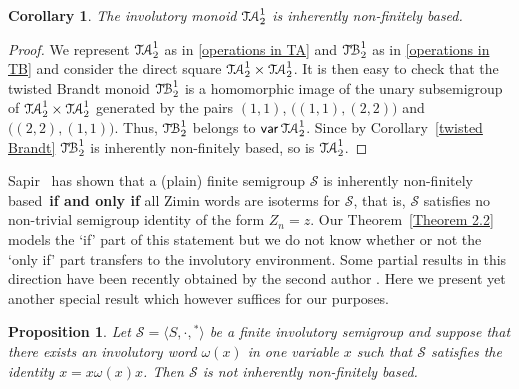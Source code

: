 \documentclass[11pt,reqno]{amsart}
\DeclareMathOperator{\var}{\mathsf{var}}
\numberwithin{equation}{section}
\newtheorem{Prop}[Thm]{Proposition}
\newtheorem{Cor}[Thm]{Corollary}
\theoremstyle{remark}
\def\om{\omega}
\def\fb{finitely based}
\def\TB{\ensuremath{\mathcal{T\kern-1pt B}_2^1}}
\def\TA{\ensuremath{\mathcal{T\kern-1pt A}_2^1}}
\begin{document}
\begin{Cor}
\label{twisted A} The involutory monoid $\TA$ is inherently
non-\fb.
\end{Cor}

\begin{proof}
We represent $\TA$ as in \eqref{operations in TA} and $\TB$ as in
\eqref{operations in TB} and consider the direct square
$\TA\times\TA$. It is then easy to check that the twisted Brandt
monoid $\TB$ is a homomorphic image of the unary subsemigroup of
$\TA\times\TA$ generated by the pairs $(1,1)$,
$\bigl((1,1),(2,2)\bigr)$ and $\bigl((2,2),(1,1)\bigr)$. Thus,
$\TB$ belongs to $\var\TA$. Since by Corollary~\ref{twisted
Brandt} $\TB$ is inherently non-\fb, so is $\TA$.
\end{proof}

Sapir~\cite[Proposition~7]{sapirburnside} has shown that a (plain)
finite semigroup $\mathcal{S}$ is inherently non-\fb\ \textbf{if
and only if} all Zimin words are isoterms for $\mathcal{S}$, that
is, $\mathcal{S}$ satisfies no non-trivial semigroup identity of
the form $Z_n=z$. Our Theorem~\ref{Theorem 2.2} models the `if'
part of this statement but we do not know whether or not the `only
if' part transfers to the involutory environment. Some partial
results in this direction have been recently obtained by the
second author \cite{Dolinka}. Here we present yet another special
result which however suffices for our purposes.

\begin{Prop}
\label{NINFB} Let $\mathcal{S}=\langle S,\cdot,{}^*\rangle$ be a
finite involutory semigroup and suppose that there exists an
involutory word $\om(x)$ in one variable $x$ such that
$\mathcal{S}$ satisfies the identity $x=x\om(x)x$. Then
$\mathcal{S}$ is not inherently non-\fb.
\end{Prop}
\end{document}
